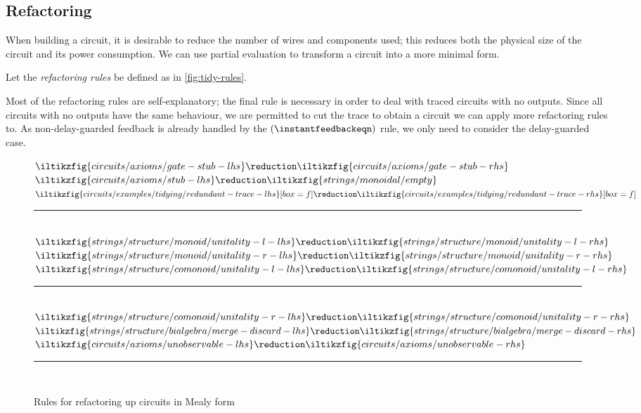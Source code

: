 \documentclass{lmcs}
\begin{document}
\subsection{Refactoring}\label{sec:tidy}

When building a circuit, it is desirable to reduce the number of wires
and components used; this reduces both the physical size of the circuit and its
power consumption.
We can use partial evaluation to transform a circuit into a more minimal form.

\begin{defi}
    Let the \emph{refactoring rules} be defined as in \autoref{fig:tidy-rules}.
\end{defi}

Most of the refactoring rules are self-explanatory; the final rule is necessary in
order to deal with traced circuits with no outputs.
Since all circuits with no outputs have the same behaviour, we are permitted to
cut the trace to obtain a circuit we can apply more refactoring rules to.
As non-delay-guarded feedback is already handled by the
\((\instantfeedbackeqn)\) rule, we only need to consider the delay-guarded case.

\begin{figure}
    \centering
    \(
    \iltikzfig{circuits/axioms/gate-stub-lhs}
    \reduction
    \iltikzfig{circuits/axioms/gate-stub-rhs}
    \)
    \quad
    \(
    \iltikzfig{circuits/axioms/stub-lhs}
    \reduction
    \iltikzfig{strings/monoidal/empty}
    \)
    \quad
    \(
    \iltikzfig{circuits/examples/tidying/redundant-trace-lhs}[box=f]
    \reduction
    \iltikzfig{circuits/examples/tidying/redundant-trace-rhs}[box=f]
    \)
    \\[0.25em]
    \rule{\textwidth}{0.1mm}
    \\[0.5em]
    \(
    \iltikzfig{strings/structure/monoid/unitality-l-lhs}
    \reduction
    \iltikzfig{strings/structure/monoid/unitality-l-rhs}
    \)
    \quad
    \(
    \iltikzfig{strings/structure/monoid/unitality-r-lhs}
    \reduction
    \iltikzfig{strings/structure/monoid/unitality-r-rhs}
    \)
    \quad
    \(
    \iltikzfig{strings/structure/comonoid/unitality-l-lhs}
    \reduction
    \iltikzfig{strings/structure/comonoid/unitality-l-rhs}
    \)
    \\[0.25em]
    \rule{\textwidth}{0.1mm}
    \\[0.5em]
    \(
    \iltikzfig{strings/structure/comonoid/unitality-r-lhs}
    \reduction
    \iltikzfig{strings/structure/comonoid/unitality-r-rhs}
    \)
    \quad
    \(
    \iltikzfig{strings/structure/bialgebra/merge-discard-lhs}
    \reduction
    \iltikzfig{strings/structure/bialgebra/merge-discard-rhs}
    \)
    \quad
    \(
    \iltikzfig{circuits/axioms/unobservable-lhs}
    \reduction
    \iltikzfig{circuits/axioms/unobservable-rhs}
    \)
    \\[0.25em]
    \rule{\textwidth}{0.1mm}
    \\[0.5em]
    \caption{Rules for refactoring up circuits in Mealy form}
    \label{fig:tidy-rules}
\end{figure}
\end{document}

